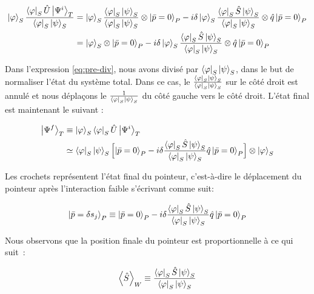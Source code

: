 \begin{onehalfspace}
    \begin{align}
        \ket{\varphi}_S\frac{\bra{\varphi}_S\hat{U}\ket{\Psi^{i}}_T}{\bra{\varphi}_S\ket{\psi}_S} &= \ket{\varphi}_S\frac{\bra{\varphi}_S\ket{\psi}_S}{\bra{\varphi}_S\ket{\psi}_S} \otimes \ket{\bar{p} = 0}_P - i\delta\ket{\varphi}_S\frac{\bra{\varphi}_S\hat{S}\ket{\psi}_S}{\bra{\varphi}_S\ket{\psi}_S}\otimes\hat{q}\ket{\bar{p} = 0}_P\label{eq:pre-div}\\
        &= \ket{\varphi}_S \otimes \ket{\bar{p} = 0}_P - i\delta\ket{\varphi}_S\frac{\bra{\varphi}_S\hat{S}\ket{\psi}_S}{\bra{\varphi}_S\ket{\psi}_S}\otimes\hat{q}\ket{\bar{p} = 0}_P
    \end{align}

    \noindent Dans l'expression \ref{eq:pre-div}, nous avons divisé par
    $\bra{\varphi}_S\ket{\psi}_S$, dans le but de normaliser l'état du
    système total. Dans ce cas, le $\frac{\bra{\varphi}_S\ket{\psi}_S}{\bra{\varphi}_S\ket{\psi}_S}$
    sur le côté droit est annulé et nous déplaçons le $\frac{1}{\bra{\varphi}_S\ket{\psi}_S}$
    du côté gauche vers le côté droit. L'état final est maintenant le
    suivant :

    \begin{align}
        \ket{\Psi^f}_T &\equiv \ket{\varphi}_S\bra{\varphi}_S\hat{U}\ket{\Psi^i}_T\\
        &\simeq \bra{\varphi}_S\ket{\psi}_S \Bigl[ \ket{\bar{p} = 0}_P - i\delta\frac{\bra{\varphi}_S\hat{S}\ket{\psi}_S}{\bra{\varphi}_S\ket{\psi}_S} \hat{q}\ket{\bar{p}=0}_P \Bigr] \otimes \ket{\varphi}_S
    \end{align}

    \noindent Les crochets représentent l’état final du 
    pointeur, c'est-à-dire le déplacement du pointeur après l’interaction
    faible s'écrivant comme suit:

    \begin{equation}
        \ket{\bar{p} = \delta s_j}_P \equiv \ket{\bar{p} = 0}_P - i\delta\frac{\bra{\varphi}_S\hat{S}\ket{\psi}_S}{\bra{\varphi}_S\ket{\psi}_S} \hat{q}\ket{\bar{p}=0}_P
    \end{equation}

    \noindent Nous observons que la position finale du pointeur est 
    proportionnelle à ce qui suit :

    \begin{equation}
        \expval{\hat{S}}_W \equiv \frac{\bra{\varphi}_S\hat{S}\ket{\psi}_S}{\bra{\varphi}_S\ket{\psi}_S}
    \end{equation}


\end{onehalfspace}
